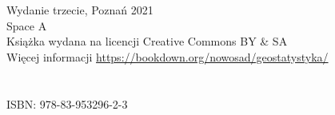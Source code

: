 \thispagestyle{empty}


\let\maketitle\oldmaketitle
\maketitle

\thispagestyle{empty}
\vspace*{\fill}
Wydanie trzecie, Poznań 2021 \\
Space A \\
Książka wydana na licencji Creative Commons BY \& SA \\
Więcej informacji \url{https://bookdown.org/nowosad/geostatystyka/} \\
\\
\\
{\large ISBN: 978-83-953296-2-3}


